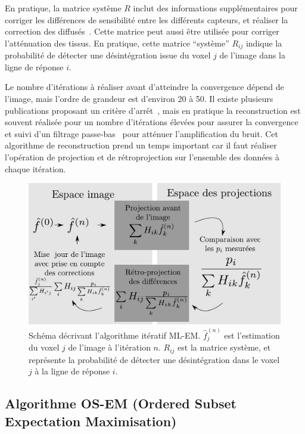 En pratique, la matrice système $R$ inclut des informations supplémentaires pour corriger les différences de sensibilité entre les différents capteurs, et réaliser la correction des diffusés~\cite{shepp1982maximum,chornoboy1990evaluation}. Cette matrice peut aussi être utilisée pour corriger l'atténuation des tissus. En pratique, cette matrice ``système'' $R_{ij}$ indique la probabilité de détecter une désintégration issue du voxel $j$ de l'image dans la ligne de réponse $i$.




Le nombre d'itérations à réaliser avant d'atteindre la convergence dépend de l'image, mais l'ordre de grandeur est d'environ 20 à 50. Il existe plusieurs publications proposant un critère d'arrêt~\cite{bissantz2006multi}, mais en pratique la reconstruction est souvent réalisée pour un nombre d'itérations élevées pour assurer la convergence~\cite{bailey2005positon} et  suivi d'un filtrage passe-bas~\cite{daube2001application} pour atténuer l'amplification du bruit. Cet algorithme de reconstruction prend un temps important car il faut réaliser l'opération de projection et de rétroprojection sur l'ensemble des données à chaque itération.

\begin{figure}
\centering
\includegraphics[width=12cm]{images/MLEM}
\caption[Schéma de principe de l'algorithme MLEM]{Schéma décrivant l'algorithme itératif ML-EM. $\hat{f}^{(n)}_j$ est l'estimation du voxel $j$ de l'image à l'itération $n$. $R_{ij}$ est la matrice système, et représente la probabilité de détecter une désintégration dans le voxel $j$ à la ligne de réponse $i$.}
\label{fig:schemaMLEM}
\end{figure}


	\subsection{Algorithme OS-EM (Ordered Subset Expectation Maximisation)}

